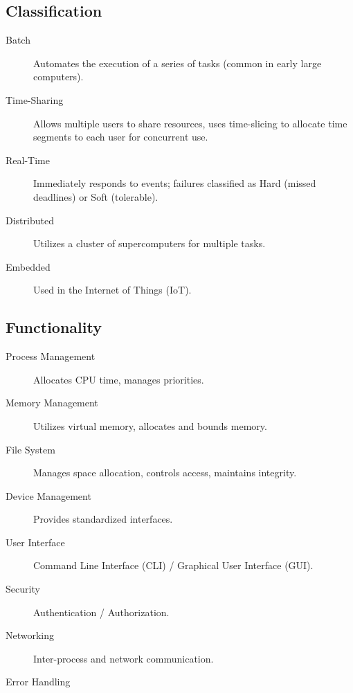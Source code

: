 \documentclass[11pt,journal,compsoc]{IEEEtran}
\begin{document}
\subsection{Classification}

\begin{description}
    \item[Batch] Automates the execution of a series of tasks (common in early large computers).
    
    \item[Time-Sharing] Allows multiple users to share resources, uses time-slicing to allocate time segments to each user for concurrent use.
    
    \item[Real-Time] Immediately responds to events; failures classified as Hard (missed deadlines) or Soft (tolerable).
    
    \item[Distributed] Utilizes a cluster of supercomputers for multiple tasks.
    
    \item[Embedded] Used in the Internet of Things (IoT).
\end{description}


\subsection{Functionality}

\begin{description}
    \item[Process Management] Allocates CPU time, manages priorities.
    
    \item[Memory Management] Utilizes virtual memory, allocates and bounds memory.
    
    \item[File System] Manages space allocation, controls access, maintains integrity.
    
    \item[Device Management] Provides standardized interfaces.
    
    \item[User Interface] Command Line Interface (CLI) / Graphical User Interface (GUI).
    
    \item[Security] Authentication / Authorization.
    
    \item[Networking] Inter-process and network communication.
    
    \item[Error Handling]
\end{description}
\end{document}
